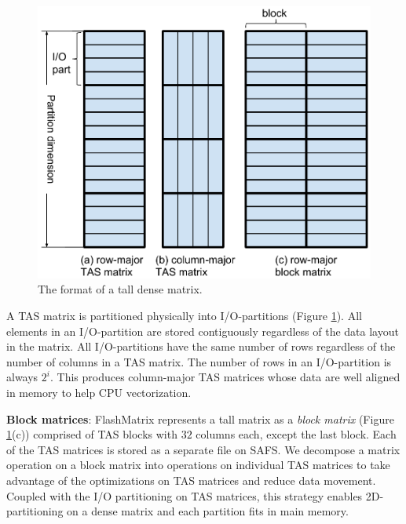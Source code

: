 \begin{figure}
	\centering
	\includegraphics[scale=0.4]{FlashMatrix_figs/dense_matrix2.pdf}
	\caption{The format of a tall dense matrix.}
	\label{fig:den_mat}
  \vspace{-12pt}
\end{figure}

A TAS matrix is partitioned physically into I/O-partitions (Figure
\ref{fig:den_mat}). 
All elements in an I/O-partition are stored
contiguously regardless of the data layout in the matrix. All 
I/O-partitions have the same number of rows regardless of
the number of columns in a TAS matrix. The number of rows in
an I/O-partition is always $2^i$. This produces column-major TAS
matrices whose data are well aligned in memory to help CPU vectorization.

\vspace{3pt}
\noindent \textbf{Block matrices}:
FlashMatrix represents a tall matrix as a \textit{block matrix} 
(Figure \ref{fig:den_mat}(c)) comprised of TAS blocks with $32$ columns each,
except the last block. 
Each of the TAS matrices is stored as a separate file on SAFS. 
We decompose a matrix operation
on a block matrix into operations on individual TAS matrices to take advantage
of the optimizations on TAS matrices and reduce data movement.
Coupled with the I/O partitioning on TAS matrices, this strategy enables
2D-partitioning on a dense matrix and each partition fits in main memory.

